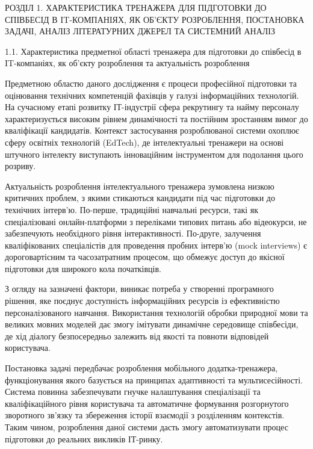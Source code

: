 \documentclass[
]{article}
\begin{document}
\protect{}\label{_heading=h.5iej67xrqf5j}{}РОЗДІЛ 1.
ХАРАКТЕРИСТИКА ТРЕНАЖЕРА ДЛЯ ПІДГОТОВКИ ДО СПІВБЕСІД В IT-КОМПАНІЯХ, ЯК
ОБ'ЄКТУ РОЗРОБЛЕННЯ, ПОСТАНОВКА ЗАДАЧІ, АНАЛІЗ ЛІТЕРАТУРНИХ ДЖЕРЕЛ ТА
СИСТЕМНИЙ АНАЛІЗ

\protect{}\label{_heading=h.de52ojbplqdx}{}1.1.
Характеристика предметної області тренажера для підготовки до співбесід
в IT-компаніях, як об'єкту розроблення та актуальність розроблення

Предметною областю даного дослідження є процеси професійної підготовки
та оцінювання технічних компетенцій фахівців у галузі інформаційних
технологій. На сучасному етапі розвитку ІТ-індустрії сфера рекрутингу та
найму персоналу характеризується високим рівнем динамічності та
постійним зростанням вимог до кваліфікації кандидатів. Контекст
застосування розроблюваної системи охоплює сферу освітніх технологій
(EdTech), де інтелектуальні тренажери на основі штучного інтелекту
виступають інноваційним інструментом для подолання цього розриву.

Актуальність розроблення інтелектуального тренажера зумовлена низкою
критичних проблем, з якими стикаються кандидати під час підготовки до
технічних інтерв'ю. По-перше, традиційні навчальні ресурси, такі як
спеціалізовані онлайн-платформи з переліками типових питань або
відеокурси, не забезпечують необхідного рівня інтерактивності. По-друге,
залучення кваліфікованих спеціалістів для проведення пробних інтерв'ю
(mock interviews) є дороговартісним та часозатратним процесом, що
обмежує доступ до якісної підготовки для широкого кола початківців.

З огляду на зазначені фактори, виникає потреба у створенні програмного
рішення, яке поєднує доступність інформаційних ресурсів із ефективністю
персоналізованого навчання. Використання технологій обробки природної
мови та великих мовних моделей дає змогу імітувати динамічне середовище
співбесіди, де хід діалогу безпосередньо залежить від якості та повноти
відповідей користувача.

Постановка задачі передбачає розроблення мобільного додатка-тренажера,
функціонування якого базується на принципах адаптивності та
мультисесійності. Система повинна забезпечувати гнучке налаштування
спеціалізації та кваліфікаційного рівня користувача та автоматичне
формування розгорнутого зворотного зв'язку та збереження історії
взаємодії з розділенням контекстів. Таким чином, розроблення даної
системи дасть змогу автоматизувати процес підготовки до реальних
викликів ІТ-ринку.
\end{document}
